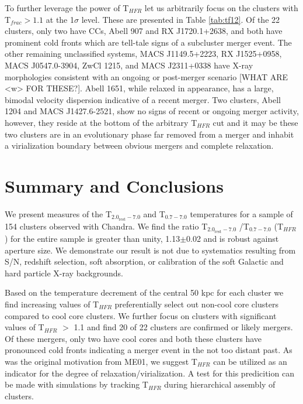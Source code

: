 \documentclass{emulateapj}
\newcommand{\tf}{T$_{HFR}$ }
\newcommand{\hard}{T$_{2.0_{\text{rest}}-7.0}$ }
\newcommand{\full}{T$_{0.7-7.0}$ }
\begin{document}
To further leverage the power of \tf let us arbitrarily focus on the
clusters with T$_{frac} > 1.1$ at the 1$\sigma$ level. These are
presented in Table \ref{tab:tf12}. Of the 22 clusters, only two have
CCs, Abell 907 and RX J1720.1+2638, and both have prominent cold
fronts which are tell-tale signs of a subcluster merger event. The
other remaining unclassified systems, MACS J1149.5+2223, RX
J1525+0958, MACS J0547.0-3904, ZwCl 1215, and MACS J2311+0338 have
X-ray morphologies consistent with an ongoing or post-merger scenario
[WHAT ARE <w> FOR THESE?]. Abell 1651, while relaxed in appearance,
has a large, bimodal velocity dispersion indicative of a recent
merger. Two clusters, Abell 1204 and MACS J1427.6-2521, show no signs
of recent or ongoing merger activity, however, they reside at the
bottom of the arbitrary \tf cut and it may be these two clusters are
in an evolutionary phase far removed from a merger and inhabit a
virialization boundary between obvious mergers and complete
relaxation.

\section{Summary and Conclusions}\label{sec:summary}

We present measures of the \hard and \full temperatures for a sample
of 154 clusters observed with Chandra. We find the ratio \hard/\full
(\tf) for the entire sample is greater than unity, 1.13$\pm$0.02 and
is robust against aperture size. We demonstrate our result is not due
to systematics resulting from S/N, redshift selection, soft
absorption, or calibration of the soft Galactic and hard particle
X-ray backgrounds.

Based on the temperature decrement of the central 50 kpc for each
cluster we find increasing values of \tf preferentially select out
non-cool core clusters compared to cool core clusters. We further
focus on clusters with significant values of \tf $>$ 1.1 and find 20 of 22
clusters are confirmed or likely mergers. Of these mergers, only two
have cool cores and both these clusters have pronounced cold fronts
indicating a merger event in the not too distant past. As was the
original motivation from ME01, we suggest \tf can be utilized as an
indicator for the degree of relaxation/virialization. A test for this
predicition can be made with simulations by tracking \tf during
hierarchical assembly of clusters.
\end{document}
